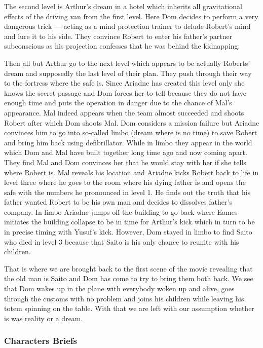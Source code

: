\documentclass{article}
\begin{document}
The second level is Arthur's dream in a hotel which inherits all gravitational
effects of the driving van from the first level. Here Dom decides to perform a
very dangerous trick --- acting as a mind protection trainer to delude Robert's
mind and lure it to his side. They convince Robert to enter his father's partner
subconscious as his projection confesses that he was behind the kidnapping.

Then all but Arthur go to the next level which appears to be actually Roberts'
dream and supposedly the last level of their plan. They push through their way
to the fortress where the safe is. Since Ariadne has created this level only she
knows the secret passage and Dom forces her to tell because they do not have
enough time and puts the operation in danger due to the chance of Mal's
appearance. Mal indeed appears when the team almost succeeded and shoots Robert
after which Dom shoots Mal. Dom considers a mission failure but Ariadne
convinces him to go into so-called limbo (dream where is no time) to save Robert
and bring him back using defibrillator. While in limbo they appear in the world
which Dom and Mal have built together long time ago and now coming apart. They
find Mal and Dom convinces her that he would stay with her if she tells where
Robert is. Mal reveals his location and Ariadne kicks Robert back to life in
level three where he goes to the room where his dying father is and opens the
safe with the numbers he pronounced in level 1. He finds out the truth that his
father wanted Robert to be his own man and decides to dissolves father's
company. In limbo Ariadne jumps off the building to go back where Eames
initiates the building collapse to be in time for Arthur's kick which in turn to
be in precise timing with Yusuf's kick. However, Dom stayed in limbo to find
Saito who died in level 3 because that Saito is his only chance to reunite with
his children.

That is where we are brought back to the first scene of the movie revealing that
the old man is Saito and Dom has come to try to bring them both back. We see
that Dom wakes up in the plane with everybody woken up and alive, goes through
the customs with no problem and joins his children while leaving his totem
spinning on the table. With that we are left with our assumption whether is was
reality or a dream.

\subsubsection*{Characters Briefs}
\end{document}
